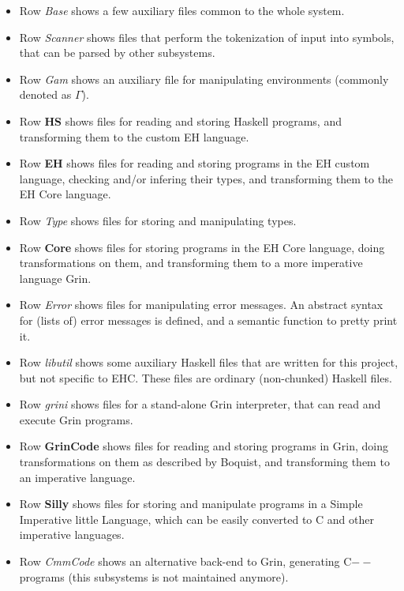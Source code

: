 \begin{itemize}

\item
Row {\em Base}
shows a few auxiliary files common to the whole system.

\item
Row {\em Scanner}
shows files that perform the tokenization of input into symbols,
that can be parsed by other subsystems.

\item
Row {\em Gam}
shows an auxiliary file for manipulating environments (commonly denoted as $\Gamma$).

\item
Row {\bf HS}
shows files for reading and storing Haskell programs,
and transforming them to the custom EH language.

\item
Row {\bf EH}
shows files for reading and storing programs
in the EH custom language, checking and/or infering their types,
and transforming them to the EH Core language.

\item
Row {\em Type}
shows files for storing and manipulating types.

\item
Row {\bf Core}
shows files for storing programs
in the EH Core language,
doing transformations on them,
and transforming them to a more imperative language Grin.


\item
Row {\em Error}
shows files for manipulating error messages.
An abstract syntax for (lists of) error messages is defined,
and a semantic function to pretty print it.

\item
Row {\em libutil}
shows some auxiliary Haskell files that are written for this project,
but not specific to EHC.
These files are ordinary (non-chunked) Haskell files.


\item
Row {\em grini}
shows files for a stand-alone Grin interpreter, that
can read and execute Grin programs.

\item
Row {\bf GrinCode}
shows files for reading and storing programs in Grin,
doing transformations on them as described by Boquist,
and transforming them to an imperative language.

\item
Row {\bf Silly}
shows files for storing and manipulate programs in
a Simple Imperative little Language,
which can be easily converted to C and other imperative languages.


\item
Row {\em CmmCode}
shows an alternative back-end to Grin, generating C$--$ programs
(this subsystems is not maintained anymore).


\end{itemize}



